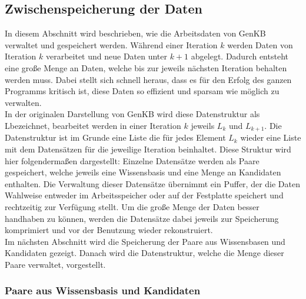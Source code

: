 \documentclass[12pt,a4paper]{article}
\begin{document}
\subsection{Zwischenspeicherung der Daten}

In diesem Abschnitt wird beschrieben, wie die Arbeitsdaten von GenKB verwaltet und gespeichert werden. Während einer Iteration $k$ werden Daten von Iteration $k$ verarbeitet und neue Daten unter $k + 1$ abgelegt. Dadurch entsteht eine große Menge an Daten, welche bis zur jeweils nächsten Iteration behalten werden muss. Dabei stellt sich schnell heraus, dass es für den Erfolg des ganzen Programms kritisch ist, diese Daten so effizient und sparsam wie möglich zu verwalten. \\
In der originalen Darstellung von GenKB wird diese Datenstruktur als \glqq L\grqq \space bezeichnet, bearbeitet werden in einer Iteration $k$ jeweils $L_k$ und  $L_{k+1}$. Die Datenstruktur ist im Grunde eine Liste die für jedes Element $L_k$ wieder eine Liste mit dem Datensätzen für die jeweilige Iteration beinhaltet. Diese Struktur wird hier folgendermaßen dargestellt: Einzelne Datensätze werden als Paare gespeichert, welche jeweils eine Wissensbasis und eine Menge an Kandidaten enthalten. Die Verwaltung dieser Datensätze übernimmt ein Puffer, der die Daten Wahlweise entweder im Arbeitsspeicher oder auf der Festplatte speichert und rechtzeitig zur Verfügung stellt. Um die große Menge der Daten besser handhaben zu können, werden die Datensätze dabei jeweils zur Speicherung komprimiert und vor der Benutzung wieder rekonstruiert. \\
Im nächsten Abschnitt wird die Speicherung der Paare aus Wissensbasen und Kandidaten gezeigt. Danach wird die Datenstruktur, welche die Menge dieser Paare verwaltet, vorgestellt.

\subsubsection{Paare aus Wissensbasis und Kandidaten}
\end{document}
